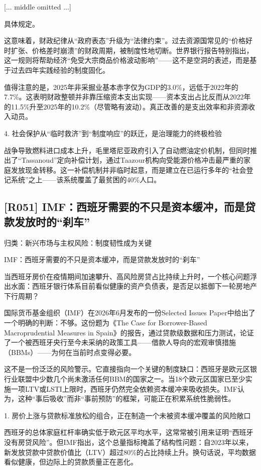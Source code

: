 \documentclass[11pt]{ctexart}
\begin{document}
[... middle omitted ...]

具体规定。

这意味着，财政纪律从“政府表态”升级为“法律约束”。过去资源国常见的“价格好时扩张、价格差时崩溃”的财政周期，被制度性地切断。世界银行报告特别指出，这一规则将帮助经济“免受大宗商品价格波动影响”——这不是空洞的表述，而是基于过去四年实践经验的制度固化。

值得注意的是，2025年非采掘业基本赤字仅为GDP的3.0\%，远低于2022年的7.7\%。这表明财政整顿并非靠压缩资本支出实现——资本支出占比反而从2022年的11.5\%升至2025年的10.2\%（尽管略有波动）。真正改善的是支出效率和非资源收入动员。

4. 社会保护从“临时救济”到“制度响应”的跃迁，是治理能力的终极检验

战争导致燃料进口成本上升，毛里塔尼亚政府引入了自动燃油定价机制，但同时推出了“Tassanoud”定向补偿计划，通过Taazour机构向受能源价格冲击最严重的家庭发放现金转移。这一补偿机制并非临时起意，而是建立在已运行多年的“社会登记系统”之上——该系统覆盖了最贫困的40\%人口。

\subsection{[R051] IMF：西班牙需要的不只是资本缓冲，而是贷款发放时的“刹车”}
{\small\color{refgray}归类：新兴市场与主权风险：制度韧性成为关键}

IMF：西班牙需要的不只是资本缓冲，而是贷款发放时的“刹车”

当西班牙房价在疫情期间加速攀升、高风险房贷占比持续上升时，一个核心问题浮出水面：西班牙银行体系目前看似健康的资产负债表，是否足以抵御下一轮房地产下行周期？

国际货币基金组织（IMF）在2026年6月发布的一份Selected Issues Paper中给出了一个明确的判断：不够。这份题为《The Case for Borrower-Based Macroprudential Measures in Spain》的报告，通过贷款级数据和压力测试，论证了一个被西班牙央行至今未采纳的政策工具——借款人导向的宏观审慎措施（BBMs）——为何在当前时点变得必要。

这不是一份泛泛的风险警示。它直接指向一个关键的制度缺口：西班牙是欧元区银行业联盟中少数几个尚未激活任何BBM的国家之一。当18个欧元区国家已至少实施一项LTV或LSTI上限时，西班牙仍然完全依赖资本缓冲来吸收损失。IMF认为，这种“事后吸收”而非“事前预防”的框架，可能正在积累系统性脆弱性。

1. 房价上涨与贷款标准放松的组合，正在制造一个未被资本缓冲覆盖的风险敞口

西班牙的总体家庭杠杆率确实低于欧元区平均水平，这常常被引用来证明“西班牙没有房贷风险”。但IMF指出，这个总量指标掩盖了结构性问题：自2023年以来，新发放贷款中贷款价值比（LTV）超过80\%的占比持续上升。换句话说，平均数据看似健康，但边际上的贷款质量正在恶化。
\end{document}
